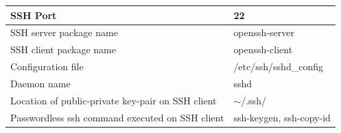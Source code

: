 \begin{flushleft}
	\begin{tabulary}{1.0\textwidth}{|p{14em}|p{14em}|}
		\toprule
		SSH Port & 22 \\
		\hline
		SSH server package name & openssh-server \\
		\hline
		SSH client package name & openssh-client \\
		\hline
		Configuration file & /etc/ssh/sshd\_config \\
		\hline
		Daemon name & sshd \\
		\hline
		Location of public-private key-pair on SSH client & $\sim$/.ssh/ \\
		\hline
		Passwordless ssh command executed on SSH client & ssh-keygen, ssh-copy-id \\
		\hline
	\end{tabulary}
	
	\label{tab:example} %

	
	
	
	

	

	
	


\end{flushleft}
\newpage


